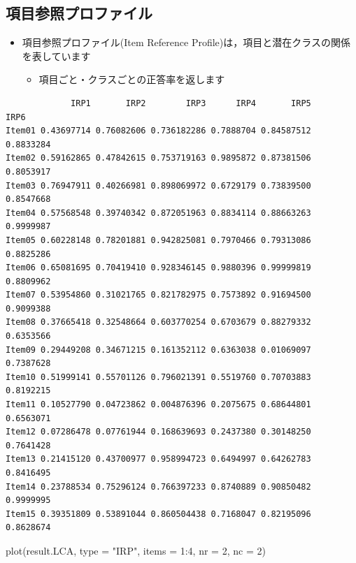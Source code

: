 \documentclass[
  a4paper,
]{ltjsbook}
\newenvironment{Shaded}{\begin{snugshade}}{\end{snugshade}}
\newcommand{\AttributeTok}[1]{\textcolor[rgb]{0.40,0.45,0.13}{#1}}
\newcommand{\DecValTok}[1]{\textcolor[rgb]{0.68,0.00,0.00}{#1}}
\newcommand{\FunctionTok}[1]{\textcolor[rgb]{0.28,0.35,0.67}{#1}}
\newcommand{\NormalTok}[1]{\textcolor[rgb]{0.00,0.23,0.31}{#1}}
\newcommand{\SpecialCharTok}[1]{\textcolor[rgb]{0.37,0.37,0.37}{#1}}
\newcommand{\StringTok}[1]{\textcolor[rgb]{0.13,0.47,0.30}{#1}}
\providecommand{\tightlist}{%
  \setlength{\itemsep}{0pt}\setlength{\parskip}{0pt}}\usepackage{longtable,booktabs,array}
\begin{document}
\subsection{項目参照プロファイル}\label{ux9805ux76eeux53c2ux7167ux30d7ux30edux30d5ux30a1ux30a4ux30eb}

\begin{itemize}
\tightlist
\item
  項目参照プロファイル(Item Reference
  Profile)は，項目と潜在クラスの関係を表しています

  \begin{itemize}
  \tightlist
  \item
    項目ごと・クラスごとの正答率を返します
  \end{itemize}
\end{itemize}

\begin{Shaded}
\end{Shaded}

\begin{verbatim}
             IRP1       IRP2        IRP3      IRP4       IRP5      IRP6
Item01 0.43697714 0.76082606 0.736182286 0.7888704 0.84587512 0.8833284
Item02 0.59162865 0.47842615 0.753719163 0.9895872 0.87381506 0.8053917
Item03 0.76947911 0.40266981 0.898069972 0.6729179 0.73839500 0.8547668
Item04 0.57568548 0.39740342 0.872051963 0.8834114 0.88663263 0.9999987
Item05 0.60228148 0.78201881 0.942825081 0.7970466 0.79313086 0.8825286
Item06 0.65081695 0.70419410 0.928346145 0.9880396 0.99999819 0.8809962
Item07 0.53954860 0.31021765 0.821782975 0.7573892 0.91694500 0.9099388
Item08 0.37665418 0.32548664 0.603770254 0.6703679 0.88279332 0.6353566
Item09 0.29449208 0.34671215 0.161352112 0.6363038 0.01069097 0.7387628
Item10 0.51999141 0.55701126 0.796021391 0.5519760 0.70703883 0.8192215
Item11 0.10527790 0.04723862 0.004876396 0.2075675 0.68644801 0.6563071
Item12 0.07286478 0.07761944 0.168639693 0.2437380 0.30148250 0.7641428
Item13 0.21415120 0.43700977 0.958994723 0.6494997 0.64262783 0.8416495
Item14 0.23788534 0.75296124 0.766397233 0.8740889 0.90850482 0.9999995
Item15 0.39351809 0.53891044 0.860504438 0.7168047 0.82195096 0.8628674
\end{verbatim}

\begin{Shaded}
\begin{Highlighting}[]
\FunctionTok{plot}\NormalTok{(result.LCA, }\AttributeTok{type =} \StringTok{"IRP"}\NormalTok{, }\AttributeTok{items =} \DecValTok{1}\SpecialCharTok{:}\DecValTok{4}\NormalTok{, }\AttributeTok{nr =} \DecValTok{2}\NormalTok{, }\AttributeTok{nc =} \DecValTok{2}\NormalTok{)}
\end{Highlighting}
\end{Shaded}
\end{document}
